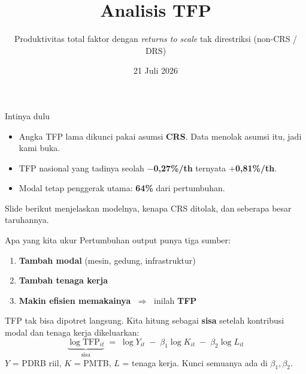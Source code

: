 \documentclass[aspectratio=169,11pt]{beamer}
\title{\textbf{Analisis TFP}}
\subtitle{Produktivitas total faktor dengan \emph{returns to scale} tak direstriksi (non-CRS / DRS)}
\date{21 Juli 2026}
\newcommand{\naik}[1]{{\color{hijau}\textbf{#1}}}
\newcommand{\turun}[1]{{\color{merah}\textbf{#1}}}
\newcommand{\key}[1]{{\color{aksen}\textbf{#1}}}
\begin{document}
\begin{frame}[plain]\titlepage\end{frame}

\begin{frame}{Intinya dulu}
  \Large
  \begin{itemize}
    \setlength\itemsep{0.8em}
    \item Angka TFP lama dikunci pakai asumsi \key{CRS}. Data menolak asumsi itu, jadi kami buka.
    \item TFP nasional yang tadinya seolah \turun{$-$0,27\%/th} ternyata \naik{$+$0,81\%/th}.
    \item Modal tetap penggerak utama: \key{64\%} dari pertumbuhan.
  \end{itemize}
  \vfill
  {\color{abu}\normalsize Slide berikut menjelaskan modelnya, kenapa CRS ditolak, dan seberapa besar taruhannya.}
\end{frame}

\begin{frame}{Apa yang kita ukur}
  Pertumbuhan output punya tiga sumber:
  \vspace{0.4em}
  \begin{enumerate}
    \setlength\itemsep{0.5em}
    \item \key{Tambah modal} (mesin, gedung, infrastruktur)
    \item \key{Tambah tenaga kerja}
    \item \key{Makin efisien memakainya} $\;\Rightarrow\;$ inilah \key{TFP}
  \end{enumerate}
  \vspace{0.8em}
  TFP tak bisa dipotret langsung. Kita hitung sebagai \textbf{sisa} setelah kontribusi
  modal dan tenaga kerja dikeluarkan:
  \[
    \underbrace{\log \mathrm{TFP}_{it}}_{\text{sisa}}
    \;=\; \log Y_{it} \;-\; \beta_1 \log K_{it} \;-\; \beta_2 \log L_{it}
  \]
  {\color{abu}\small $Y$ = PDRB riil, $K$ = PMTB, $L$ = tenaga kerja. Kunci semuanya ada di $\beta_1,\beta_2$.}
\end{frame}
\end{document}
